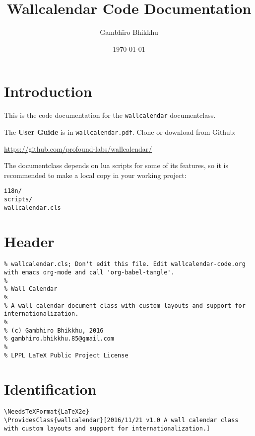 \documentclass[11pt,oneside]{memoir-article}
\author{Gambhīro Bhikkhu}
\date{\today}
\title{Wallcalendar Code Documentation}
\begin{document}
\maketitle

\chapter{Introduction}
\label{sec-1}

\bigskip

This is the code documentation for the \texttt{wallcalendar} documentclass.

The \textbf{User Guide} is in \texttt{wallcalendar.pdf}. Clone or download from Github:

\href{https://github.com/profound-labs/wallcalendar/}{https://github.com/profound-labs/wallcalendar/}

The documentclass depends on lua scripts for some of its features, so it is
recommended to make a local copy in your working project:

\begin{verbatim}
i18n/
scripts/
wallcalendar.cls
\end{verbatim}

\bigskip

\tableofcontents*

\clearpage

\chapter{Header}
\label{sec-2}

\begin{verbatim}
% wallcalendar.cls; Don't edit this file. Edit wallcalendar-code.org with emacs org-mode and call 'org-babel-tangle'.
%
% Wall Calendar
%
% A wall calendar document class with custom layouts and support for internationalization.
%
% (c) Gambhiro Bhikkhu, 2016
% gambhiro.bhikkhu.85@gmail.com
%
% LPPL LaTeX Public Project License
\end{verbatim}

\chapter{Identification}
\label{sec-3}

\begin{verbatim}
\NeedsTeXFormat{LaTeX2e}
\ProvidesClass{wallcalendar}[2016/11/21 v1.0 A wall calendar class with custom layouts and support for internationalization.]
\end{verbatim}
\end{document}
